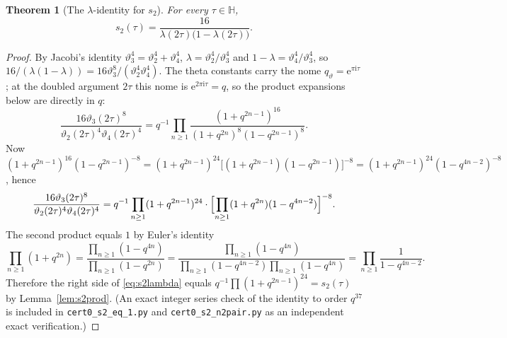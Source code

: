 \documentclass[11pt]{article}
\newtheorem{theorem}{Theorem}[section]
\theoremstyle{definition}
\theoremstyle{remark}
\newcommand{\Hh}{\mathbb{H}}
\newcommand{\ii}{\mathrm{i}}
\newcommand{\e}{\mathrm{e}}
\begin{document}
\begin{theorem}[The $\lambda$-identity for $s_2$]\label{thm:s2lambda}
For every $\tau\in\Hh$,
\begin{equation}\label{eq:s2lambda}
  s_2(\tau)=\frac{16}{\lambda(2\tau)\bigl(1-\lambda(2\tau)\bigr)}.
\end{equation}
\end{theorem}
\begin{proof}
By Jacobi's identity $\vartheta_3^4=\vartheta_2^4+\vartheta_4^4$,
$\lambda=\vartheta_2^4/\vartheta_3^4$ and $1-\lambda=\vartheta_4^4/\vartheta_3^4$,
so $16/(\lambda(1-\lambda))=16\vartheta_3^8/(\vartheta_2^4\vartheta_4^4)$.
The theta constants carry the nome $q_\vartheta=\e^{\pi\ii\tau}$; at the
doubled argument $2\tau$ this nome is $\e^{2\pi\ii\tau}=q$, so the product
expansions below are directly in $q$:
\[
  \frac{16\vartheta_3(2\tau)^8}{\vartheta_2(2\tau)^4\vartheta_4(2\tau)^4}
  =q^{-1}\prod_{n\ge1}\frac{(1+q^{2n-1})^{16}}{(1+q^{2n})^{8}(1-q^{2n-1})^{8}}.
\]
Now $(1+q^{2n-1})^{16}(1-q^{2n-1})^{-8}
=(1+q^{2n-1})^{24}\bigl[(1+q^{2n-1})(1-q^{2n-1})\bigr]^{-8}
=(1+q^{2n-1})^{24}(1-q^{4n-2})^{-8}$, hence
\[
  \frac{16\vartheta_3(2\tau)^8}{\vartheta_2(2\tau)^4\vartheta_4(2\tau)^4}
  =q^{-1}\prod_{n\ge1}(1+q^{2n-1})^{24}\cdot
   \Bigl[\prod_{n\ge1}(1+q^{2n})(1-q^{4n-2})\Bigr]^{-8}.
\]
The second product equals $1$ by Euler's identity
\[
  \prod_{n\ge1}(1+q^{2n})
  =\frac{\prod_{n\ge1}(1-q^{4n})}{\prod_{n\ge1}(1-q^{2n})}
  =\frac{\prod_{n\ge1}(1-q^{4n})}
        {\prod_{n\ge1}(1-q^{4n-2})\prod_{n\ge1}(1-q^{4n})}
  =\prod_{n\ge1}\frac1{1-q^{4n-2}}.
\]
Therefore the right side of \eqref{eq:s2lambda} equals
$q^{-1}\prod(1+q^{2n-1})^{24}=s_2(\tau)$ by Lemma~\ref{lem:s2prod}. (An
exact integer series check of the identity to order $q^{37}$ is included
in \texttt{cert0\_s2\_eq\_1.py} and \texttt{cert0\_s2\_n2pair.py} as an
independent exact verification.)
\end{proof}
\end{document}
